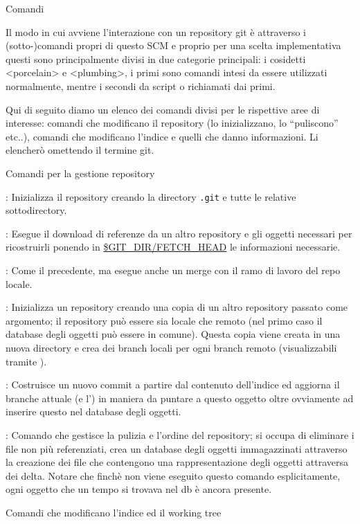 \capitolo Comandi

Il modo in cui avviene l'interazione con un repository git \`e attraverso i
(sotto-)comandi propri di questo SCM e proprio per una scelta implementativa
questi sono principalmente divisi in due categorie principali: i cosidetti
\evidenzia<porcelain> e \evidenzia<plumbing>, i primi sono comandi intesi da
essere utilizzati normalmente, mentre i secondi da script o richiamati dai primi.

Qui di seguito diamo un elenco dei comandi divisi per le rispettive aree di
interesse: comandi che modificano il repository (lo inizializzano, lo
``puliscono'' etc..), comandi che modificano l'indice e quelli che danno
informazioni. Li elencher\`o omettendo il termine git.

\sezione Comandi per la gestione repository

\elemento{}: Inizializza il repository creando la directory {\tt .git}
e tutte le relative sottodirectory.

\elemento{}: Esegue il download di referenze da un altro
repository e gli oggetti necessari per ricostruirli ponendo in
\url{$GIT_DIR/FETCH_HEAD} le informazioni necessarie.

\elemento{}: Come il precedente, ma esegue anche un merge con il ramo
di lavoro del repo locale.

\elemento {}: Inizializza un repository creando una copia di un altro
repository passato come argomento; il repository pu\`o essere sia locale che
remoto (nel primo caso il database degli oggetti pu\`o essere in comune).
Questa copia viene creata in una nuova directory e crea dei branch locali per
ogni branch remoto (visualizzabili tramite ).

\elemento{}: Costruisce un nuovo commit a partire dal contenuto
dell'indice ed aggiorna il branche attuale (e l') in maniera da
puntare a questo oggetto oltre ovviamente ad inserire questo nel database degli
oggetti.

\elemento {}: Comando che gestisce la pulizia e l'ordine del repository;
si occupa di eliminare i file non pi\`u referenziati, crea un database degli
oggetti immagazzinati attraverso la creazione dei file  che
contengono una rappresentazione degli oggetti attraversa dei delta. Notare che
finch\`e non viene eseguito questo comando esplicitamente, ogni oggetto che un
tempo si trovava nel db \`e ancora presente.

\sezione Comandi che modificano l'indice ed il working tree

